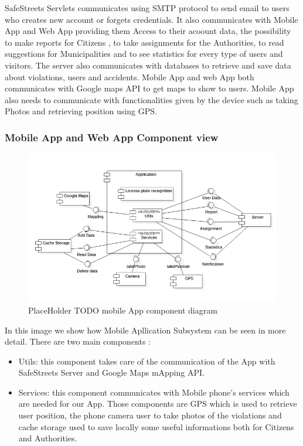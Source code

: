 SafeStreets Servlets communicates using SMTP protocol to send email to users who creates new account or forgets credentials. It also communicates with Mobile App and Web App providing them Access to their acoount data, the possibility to make reports for Citizens , to take assignments for the Authorities, to read suggestions for Municipalities and to see statistics for every type of users and visitors.
The server also communicates with databases to retrieve and save data about violations, users and accidents.
Mobile App and web App both communicates with Google maps API  to get maps to show to users. Mobile App also needs to communicate with functionalities given by the device such as taking Photos and retrieving position using GPS.
\subsubsection{Mobile App and Web App  Component view}
\begin{figure}[H]
\centering
\includegraphics{Images/MobileApplicationComponent.png}
\caption{\label{fig:ComWI}PlaceHolder TODO mobile App component diagram}
\end{figure}
In this image we show how Mobile Apllication Subsystem can be seen in more detail.
There are two main components : 
\begin{itemize}
\item Utils:  this component takes care of the communication of the App with SafeStreets Server and Google Maps mApping API.
\item Services: this component communicates with Mobile phone's services which are needed for our App. Those components are GPS which is used to retrieve user position, the phone camera user to take photos of the violations and cache storage used to save locally some useful informations both for Citizens and Authorities.
\end{itemize}

